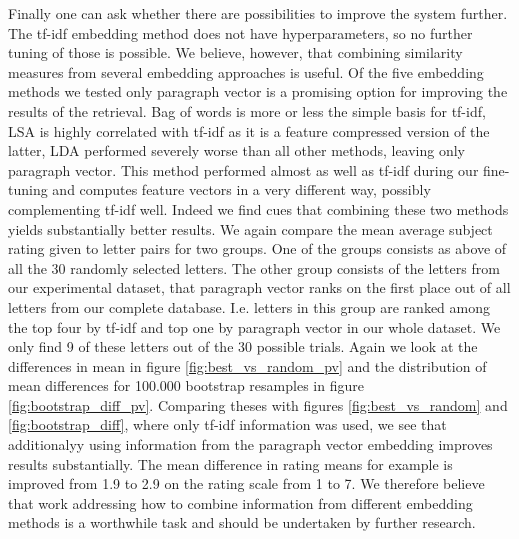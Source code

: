 Finally one can ask whether there are possibilities to improve the system further. The tf-idf embedding method does not have hyperparameters, so no further tuning of those is possible. We believe, however, that combining similarity measures from several embedding approaches is useful. Of the five embedding methods we tested only paragraph vector is a promising option for improving the results of the retrieval. Bag of words is more or less the simple basis for tf-idf, LSA is highly correlated with tf-idf as it is a feature compressed version of the latter, LDA performed severely worse than all other methods, leaving only paragraph vector. This method performed almost as well as tf-idf during our fine-tuning and computes feature vectors in a very different way, possibly complementing tf-idf well. Indeed we find cues that combining these two methods yields substantially better results. We again compare the mean average subject rating given to letter pairs for two groups. One of the groups consists as above of all the 30 randomly selected letters. The other group consists of the letters from our experimental dataset, that paragraph vector ranks on the first place out of all letters from our complete database. I.e. letters in this group are ranked among the top four by tf-idf and top one by paragraph vector in our whole dataset. We only find 9 of these letters out of the 30 possible trials. Again we look at the differences in mean in figure \ref{fig:best_vs_random_pv} and the distribution of mean differences for 100.000 bootstrap resamples in figure \ref{fig:bootstrap_diff_pv}. Comparing theses with figures \ref{fig:best_vs_random} and \ref{fig:bootstrap_diff}, where only tf-idf information was used, we see that additionalyy using information from the paragraph vector embedding improves results substantially. The mean difference in rating means for example is improved from 1.9 to 2.9 on the rating scale from 1 to 7. We therefore believe that work addressing how to combine information from different embedding methods is a worthwhile task and should be undertaken by further research.




